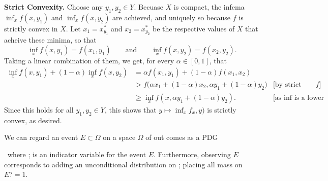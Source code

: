 
\textbf{Strict Convexity.}
Choose any $y_1, y_2 \in Y$. 
Becuase $X$ is compact, the infema $\inf_x f(x, y_1)$ and $\inf_x f(x, y_2)$ are achieved, and uniquely so because $f$ is strictly convex in $X$. Let $x_1 = x^*_{y_1}$ and $x_2 = x^*_{y_2}$ be the respective values of $X$ that acheive these minima, so that
\[ \inf_x f(x,y_1) = f(x_1, y_1) \qquad\text{and}\qquad \inf_x f(x,y_2) = f(x_2, y_2) .\]
Taking a linear combination of them, we get, for every $\alpha \in [0,1]$, that
\begin{align*}
    \inf_x f(x,y_1)+ (1-\alpha) \inf_x f(x,y_2) &= \alpha f(x_1,y_1) + (1-\alpha) f(x_1, x_2) & \\
    &> f\Big(\alpha  x_1 + (1-\alpha) x_2 , \alpha  y_1 + (1-\alpha) y_2 \Big)  & \text{[by strict convexity of $f$]}\\
    &\ge \inf_x f(x, \alpha  y_1 + (1-\alpha) y_2). & \text{[as $\inf$ is a lower bound]}
\end{align*}
Since this holds for all $y_1, y_2 \in Y$, this shows that $y \mapsto \inf_x f_x,y)$ is strictly convex, as desired.





We can regard an event $E \subset \Omega$ on a space $\Omega$ of out comes as a PDG
\, where  ; is an indicator variable for the event $E$. Furthermore, observing $E$ corresponds to adding an unconditional distribution on   ; placing all mass on $E? = 1$. 

